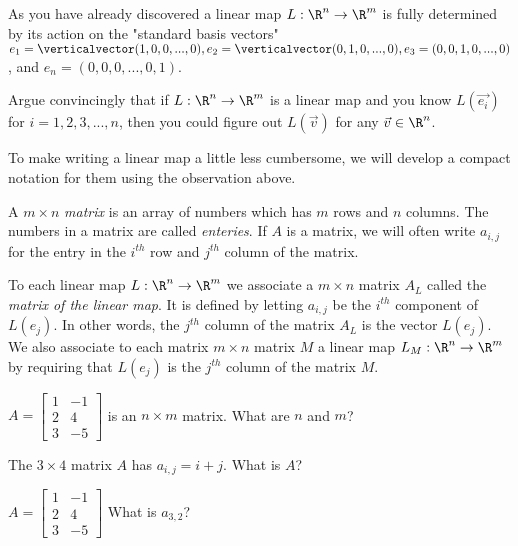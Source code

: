 	As you have already discovered a linear map $L: \R^n \to \R^m$  is fully determined by
	its action on the "standard basis vectors" $e_1 = \verticalvector(1,0,0,...,0), e_2 = \verticalvector(0,1,0,...,0), e_3 = (0,0,1,0,...,0)$, and $e_n = (0,0,0,...,0,1)$.
	
	\begin{question}
		Argue convincingly that if $L:\R^n \to\R^m$ is a linear map and you know $L(\vec{e_i})$ for $i=1,2,3,...,n$, then you could figure out $L(\vec{v})$ for
		any $\vec{v} \in \R^n$.
	\end{question}
	
	To make writing a linear map a little less cumbersome, we will develop a compact notation for them using the observation above. 
	
	\begin{definition}
		A $m \times n$ \textit{matrix} is an array of numbers which has $m$ rows and $n$ columns.  The numbers in a matrix are called \textit{enteries}. If $A$ is a matrix, 
		we will often write $a_{i,j}$ for the entry in the $i^{th}$  row and $j^{th}$ column of the matrix.
	\end{definition}
	
	\begin{definition}
		To each linear map $L: \R^n \to \R^m$  we associate a $m \times n$ matrix $A_L$ called the \textit{matrix of the linear map}.  It is defined 
		by letting $a_{i,j}$ be the $i^{th}$ component of $L(e_j)$.  In other words, the $j^{th}$ column of the matrix $A_L$ is the vector $L(e_j)$.  We also associate to each 
		matrix $m \times n$ matrix $M$ a linear map $L_M: \R^n \to \R^m$ by requiring that $L(e_j)$ is the $j^{th}$ column of the matrix $M$. 
	\end{definition}
	
	\begin{question}
		$A = \begin{bmatrix}
		1&-1\\2&4\\3&-5
		\end{bmatrix}$
		is an $n \times m$ matrix.  What are $n$ and $m$? 
	\end{question}
	
	\begin{question}
		The $3 \times 4$ matrix $A$ has $a_{i,j} = i+j$.  What is $A$?
	\end{question}
	
	\begin{question}
		$A = \begin{bmatrix}
		1&-1\\2&4\\3&-5
		\end{bmatrix}$
		 What is $a_{3,2}$?
	\end{question}
	
